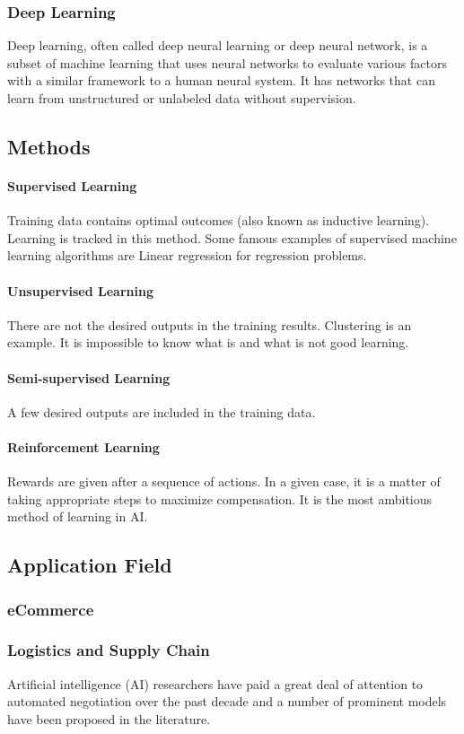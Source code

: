 \subsubsection{Deep Learning}
Deep learning, often called deep neural learning or deep neural network, is a subset of machine learning that uses neural networks to evaluate various factors with a similar framework to a human neural system. It has networks that can learn from unstructured or unlabeled data without supervision.

\subsection{Methods}
\paragraph{Supervised Learning}
Training data contains optimal outcomes (also known as inductive learning). Learning is tracked in this method. Some famous examples of supervised machine learning algorithms are Linear regression for regression problems. 
\paragraph{Unsupervised Learning} 
There are not the desired outputs in the training results. Clustering is an example. It is impossible to know what is and what is not good learning.
\paragraph{Semi-supervised Learning}
A few desired outputs are included in the training data.
\paragraph{Reinforcement Learning}
Rewards are given after a sequence of actions. In a given case, it is a matter of taking appropriate steps to maximize compensation. It is the most ambitious method of learning in AI.

\subsection{Application Field}
\subsubsection{eCommerce}
\subsubsection{Logistics and Supply Chain}
Artificial intelligence (AI) researchers have paid a great deal of attention to automated negotiation over the past decade and a number of prominent models have been proposed in the literature.
